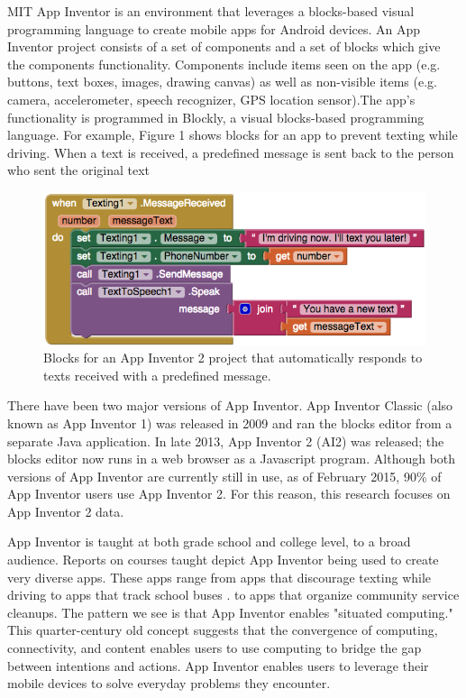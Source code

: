 \documentclass[conference]{IEEEtran}
\begin{document}
 

MIT App Inventor is an environment that leverages a blocks-based visual programming language to create mobile apps for Android devices\citep{ai_home}. An App Inventor project consists of a set of components and a set of blocks which give the components functionality. Components include items seen on the app (e.g. buttons, text boxes, images, drawing canvas) as well as non-visible items (e.g. camera, accelerometer, speech recognizer, GPS location sensor).The app's functionality is programmed in Blockly, a visual blocks-based programming language.\cite{blockly} For example, Figure 1 shows blocks for an app to prevent texting while driving. When a text is received, a predefined message is sent back to the person who sent the original text

\begin{figure}[h!]
	\centering
	\includegraphics[width=0.95\linewidth]{fig1.png}
	\caption{Blocks for an App Inventor 2 project that automatically responds to texts received with a predefined message.}
	\label{FIgure 1: Label}
\end{figure}

There have been two major versions of App Inventor. App Inventor Classic (also known as App Inventor 1) was released in 2009 and ran the blocks editor from a separate Java application. In late 2013, App Inventor 2 (AI2) was released; the blocks editor now runs in a web browser as a Javascript program. Although both versions of App Inventor are currently still in use, as of February 2015, 90\% of App Inventor users use App Inventor 2. For this reason, this research focuses on App Inventor 2 data\citep{naming:turbak}.

App Inventor is taught at both grade school and college level, to a broad audience. Reports on courses taught depict App Inventor being used to create very diverse apps. These apps range from apps that discourage texting while driving to apps that track school buses \cite{thinking:turbak}. to apps that organize community service cleanups. The pattern we see is that App Inventor enables "situated computing." This quarter-century old concept suggests that the convergence of computing, connectivity, and content enables users to use computing to bridge the gap between intentions and actions. App Inventor enables users to leverage their mobile devices to solve everyday problems they encounter. 
\end{document}
